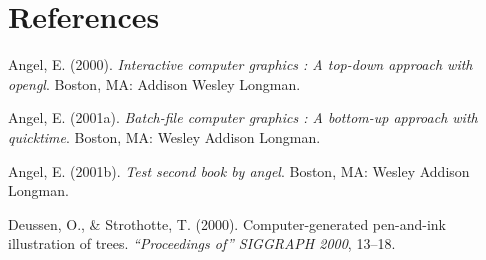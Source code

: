 \documentclass[12pt,oneside]{reedthesis}
\theoremstyle{definition}
\theoremstyle{definition}
\theoremstyle{definition}
\theoremstyle{remark}
\begin{document}
\backmatter

\chapter*{References}\label{references}


\noindent

\setlength{\parindent}{-0.20in} \setlength{\leftskip}{0.20in}
\setlength{\parskip}{8pt}

\hypertarget{refs}{}
\hypertarget{ref-angel2000}{}
Angel, E. (2000). \emph{Interactive computer graphics : A top-down
approach with opengl}. Boston, MA: Addison Wesley Longman.

\hypertarget{ref-angel2001}{}
Angel, E. (2001a). \emph{Batch-file computer graphics : A bottom-up
approach with quicktime}. Boston, MA: Wesley Addison Longman.

\hypertarget{ref-angel2002a}{}
Angel, E. (2001b). \emph{Test second book by angel}. Boston, MA: Wesley
Addison Longman.

\hypertarget{ref-deussen2000}{}
Deussen, O., \& Strothotte, T. (2000). Computer-generated pen-and-ink
illustration of trees. \emph{``Proceedings of'' SIGGRAPH 2000}, 13--18.


\end{document}
